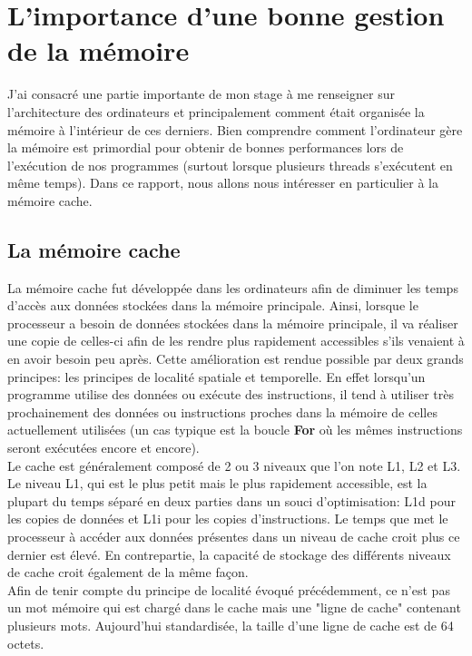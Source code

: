 \chapter{L'importance d'une bonne gestion de la mémoire}

J'ai consacré une partie importante de mon stage à me renseigner sur l'architecture des ordinateurs et principalement comment était organisée la mémoire à l'intérieur de ces derniers. Bien comprendre comment l'ordinateur gère la mémoire est primordial pour obtenir de bonnes performances lors de l'exécution de nos programmes \cite{Drepper} (surtout lorsque plusieurs threads s'exécutent en même temps). Dans ce rapport, nous allons nous intéresser en particulier à la mémoire cache.

\section{La mémoire cache}

La mémoire cache fut développée dans les ordinateurs afin de diminuer les temps d'accès aux données stockées dans la mémoire principale. Ainsi, lorsque le processeur a besoin de données stockées dans la mémoire principale, il va réaliser une copie de celles-ci afin de les rendre plus rapidement accessibles s'ils venaient à en avoir besoin peu après. Cette amélioration est rendue possible par deux grands principes: les principes de localité spatiale et temporelle. En effet lorsqu'un programme utilise des données ou exécute des instructions, il tend à utiliser très prochainement des données ou instructions proches dans la mémoire de celles actuellement utilisées (un cas typique est la boucle \textbf{For} où les mêmes instructions seront exécutées encore et encore). \\

Le cache est généralement composé de 2 ou 3 niveaux que l'on note L1, L2 et L3. Le niveau L1, qui est le plus petit mais le plus rapidement accessible, est la plupart du temps séparé en deux parties dans un souci d'optimisation: L1d pour les copies de données et L1i pour les copies d'instructions. Le temps que met le processeur à accéder aux données présentes dans un niveau de cache croit plus ce dernier est élevé. En contrepartie, la capacité de stockage des différents niveaux de cache croit également de la même façon. \\

Afin de tenir compte du principe de localité évoqué précédemment, ce n'est pas un mot mémoire qui est chargé dans le cache mais une "ligne de cache" contenant plusieurs mots. Aujourd'hui standardisée, la taille d'une ligne de cache est de 64 octets. 


